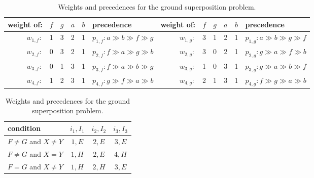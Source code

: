 \begin{table}
\begin{center}
\begin{tabular}{r@{\hskip 0.5em}c c c c@{\hskip 0.5em} |@{\hskip 0.5em} l@{\hskip 1em} ||@{\hskip 0.5em} r@{\hskip 0.5em} c c c c@{\hskip 0.5em} |@{\hskip 0.5em} l}
  weight of: & $f$ & $g$ & $a$ & $b$ & precedence
  & weight of: & $f$ & $g$ & $a$ & $b$ & precedence \\ \hline
  $w_{1,f}:$  & 1   & 3   & 2   & 1   & $p_{1,f}: a \gg b \gg f \gg g$ &
  $w_{1,g}:$  & 3   & 1   & 2   & 1   & $p_{1,g}: a \gg b \gg g \gg f$ \\ \hline
  $w_{2,f}:$  & 0   & 3   & 2   & 1   & $p_{2,f}: f \gg a \gg g \gg b$ &
  $w_{2,g}:$  & 3   & 0   & 2   & 1   & $p_{2,g}: g \gg a \gg f \gg b$ \\ \hline
  $w_{3,f}:$  & 0   & 1   & 3   & 1   & $p_{3,f}: f \gg a \gg b \gg g$ &
  $w_{3,g}:$  & 1   & 0   & 3   & 1   & $p_{3,g}: g \gg a \gg b \gg f$ \\ \hline
  $w_{4,f}:$  & 1   & 2   & 3   & 1   & $p_{4,f}: g \gg f \gg a \gg b$ &
  $w_{4,g}:$  & 2   & 1   & 3   & 1   & $p_{4,g}: f \gg g \gg a \gg b$ \\ \hline
\end{tabular}

\hspace*{0.5em}

\begin{tabular}{l@{\hskip 1.05em} || c | c | c}
\hline
condition & $i_1, I_1$ & $i_2, I_2$ & $i_3, I_3$ \\ \hline
$F \not = G$ and $X \not= Y$ & $1,E$ & $2, E$ & $3, E$ \\
$F \not = G$ and $X = Y$ & $1, H$ & $2, E$ & $4, H$ \\
$F = G$ and $X \not= Y$ & $1, H$ & $2, H$ & $3, E$
\end{tabular}
\hspace*{0.5em}
\caption{Weights and precedences for the ground superposition problem.}
\label{tab:ground-sup}
\end{center}
\end{table}

